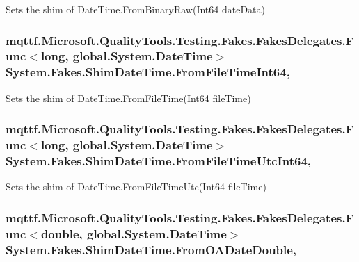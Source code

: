 Sets the shim of Date\-Time.\-From\-Binary\-Raw(\-Int64 date\-Data)

\hypertarget{class_system_1_1_fakes_1_1_shim_date_time_affb1f8293885a58d8170931a695cfed6}{
\subsubsection[{From\-File\-Time\-Int64}]{\setlength{\rightskip}{0pt plus 5cm}mqttf.\-Microsoft.\-Quality\-Tools.\-Testing.\-Fakes.\-Fakes\-Delegates.\-Func$<$long, global.\-System.\-Date\-Time$>$ System.\-Fakes.\-Shim\-Date\-Time.\-From\-File\-Time\-Int64\hspace{0.3cm}{\ttfamily [static]}, {\ttfamily [set]}}}\label{class_system_1_1_fakes_1_1_shim_date_time_affb1f8293885a58d8170931a695cfed6}


Sets the shim of Date\-Time.\-From\-File\-Time(\-Int64 file\-Time)

\hypertarget{class_system_1_1_fakes_1_1_shim_date_time_a88986853c4093d968bb9545d7433ae80}{
\subsubsection[{From\-File\-Time\-Utc\-Int64}]{\setlength{\rightskip}{0pt plus 5cm}mqttf.\-Microsoft.\-Quality\-Tools.\-Testing.\-Fakes.\-Fakes\-Delegates.\-Func$<$long, global.\-System.\-Date\-Time$>$ System.\-Fakes.\-Shim\-Date\-Time.\-From\-File\-Time\-Utc\-Int64\hspace{0.3cm}{\ttfamily [static]}, {\ttfamily [set]}}}\label{class_system_1_1_fakes_1_1_shim_date_time_a88986853c4093d968bb9545d7433ae80}


Sets the shim of Date\-Time.\-From\-File\-Time\-Utc(\-Int64 file\-Time)

\hypertarget{class_system_1_1_fakes_1_1_shim_date_time_aa0f5481d14897b906cef5ac695284e16}{
\subsubsection[{From\-O\-A\-Date\-Double}]{\setlength{\rightskip}{0pt plus 5cm}mqttf.\-Microsoft.\-Quality\-Tools.\-Testing.\-Fakes.\-Fakes\-Delegates.\-Func$<$double, global.\-System.\-Date\-Time$>$ System.\-Fakes.\-Shim\-Date\-Time.\-From\-O\-A\-Date\-Double\hspace{0.3cm}{\ttfamily [static]}, {\ttfamily [set]}}}\label{class_system_1_1_fakes_1_1_shim_date_time_aa0f5481d14897b906cef5ac695284e16}


